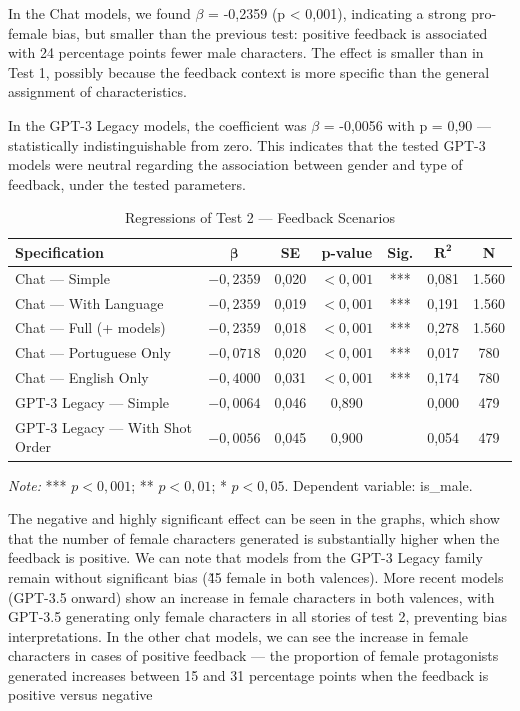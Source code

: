 \documentclass[12pt,a4paper]{article}
\begin{document}
In the Chat models, we found $\beta$ = -0,2359 (p < 0,001), indicating a strong
pro-female bias, but smaller than the previous test:
positive feedback is associated with 24 percentage points fewer
male characters. The effect is smaller than in Test 1, possibly
because the feedback context is more specific than the general assignment
of characteristics.

In the GPT-3 Legacy models, the coefficient was $\beta$ = -0,0056 with p = 0,90 ---
statistically indistinguishable from zero. This indicates that the tested
GPT-3 models were neutral regarding the association between gender and type of
feedback, under the tested parameters.

\begin{table}[H]
\centering
\caption{Regressions of Test 2 --- Feedback Scenarios}
\label{tab:reg-teste2}
\begin{tabular}{lcccccc}
\toprule
\textbf{Specification} & $\boldsymbol{\beta}$ & \textbf{SE} & \textbf{p-value} & \textbf{Sig.} & $\boldsymbol{R^2}$ & \textbf{N} \\
\midrule
Chat --- Simple & $-0,2359$ & 0,020 & $<0,001$ & *** & 0,081 & 1.560 \\
Chat --- With Language & $-0,2359$ & 0,019 & $<0,001$ & *** & 0,191 & 1.560 \\
Chat --- Full (+ models) & $-0,2359$ & 0,018 & $<0,001$ & *** & 0,278 & 1.560 \\
Chat --- Portuguese Only & $-0,0718$ & 0,020 & $<0,001$ & *** & 0,017 & 780 \\
Chat --- English Only & $-0,4000$ & 0,031 & $<0,001$ & *** & 0,174 & 780 \\
GPT-3 Legacy --- Simple & $-0,0064$ & 0,046 & 0,890 & & 0,000 & 479 \\
GPT-3 Legacy --- With Shot Order & $-0,0056$ & 0,045 & 0,900 & & 0,054 & 479 \\
\bottomrule
\end{tabular}

\smallskip
\footnotesize\textit{Note:} *** $p < 0,001$; ** $p < 0,01$; * $p < 0,05$. Dependent variable: is\_male.
\end{table}

The negative and highly significant effect can be seen in the graphs,
which show that the number of female characters generated is
substantially higher when the feedback is positive. We can note that
models from the GPT-3 Legacy family remain without significant bias (\~45%
female in both valences). More recent models (GPT-3.5 onward) show an increase in female characters in both
valences, with GPT-3.5 generating only female characters in all
stories of test 2, preventing bias interpretations. In the other
chat models, we can see the increase in female characters in cases
of positive feedback --- the proportion of female protagonists generated
increases between 15 and 31 percentage points when the feedback is positive
versus negative
\end{document}
